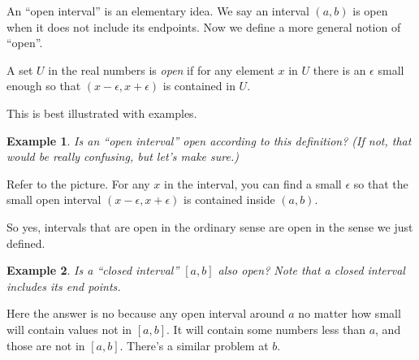 \documentclass[11pt]{book}
\newenvironment{definition}[1][Definition]{\begin{trivlist}
\item[\hskip \labelsep {\bfseries #1}]}{\end{trivlist}}
\newtheorem{example}{Example}
\numberwithin{example}{chapter}
\begin{document}
An ``open interval'' is an elementary idea.  We say an interval $(a,b)$ is open when it does not include its endpoints.  Now we define a more general notion of ``open''.  




\begin{definition}
A set $U$ in the real numbers is \emph{open} if for any element $x$ in $U$ there is an $\epsilon$ small enough so that $(x-\epsilon , x+\epsilon)$ is contained in $U$.  


\end{definition}



This is best illustrated with examples.  

\begin{example}
Is an ``open interval'' \emph{ open} according to this definition?  (If not, that would be really confusing, but let's make sure.)
\end{example}

Refer to the picture.  For any $x$ in the interval, you can find a small $\epsilon$ so that the small open interval $(x-\epsilon , x+\epsilon)$ is contained inside $(a,b)$. 




\begin{center}
\end{center}


So yes, intervals that are open in the ordinary sense are open in the sense we just defined.  


\begin{example}
Is a ``closed interval'' $[a,b]$ also \emph{open}?  Note that a closed interval includes its end points.

\end{example}

Here the answer is no because any open interval around $a$ no matter how small will contain values not in $[a,b]$.  It will contain some numbers less than $a$, and those are not in $[a,b]$.  There's a similar problem at $b$.  
\end{document}
